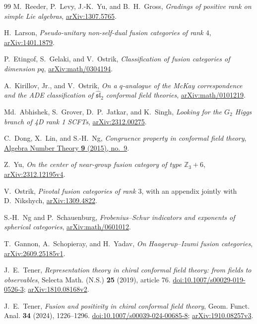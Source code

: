 \begin{thebibliography}{99}
M.~Reeder, P.~Levy, J.-K.~Yu, and B.~H.~Gross,
\emph{Gradings of positive rank on simple Lie algebras},
\href{https://arxiv.org/abs/1307.5765}{arXiv:1307.5765}.

H.~Larson,
\emph{Pseudo-unitary non-self-dual fusion categories of rank $4$},
\href{https://arxiv.org/abs/1401.1879}{arXiv:1401.1879}.

P.~Etingof, S.~Gelaki, and V.~Ostrik,
\emph{Classification of fusion categories of dimension $pq$},
\href{https://arxiv.org/abs/math/0304194}{arXiv:math/0304194}.

A.~Kirillov, Jr., and V.~Ostrik,
\emph{On a $q$-analogue of the McKay correspondence and the ADE classification
of $\widehat{\mathfrak{sl}}_2$ conformal field theories},
\href{https://arxiv.org/abs/math/0101219}{arXiv:math/0101219}.

Md.~Abhishek, S.~Grover, D.~P.~Jatkar, and K.~Singh,
\emph{Looking for the $G_2$ Higgs branch of 4D rank 1 SCFTs},
\href{https://arxiv.org/abs/2312.00275}{arXiv:2312.00275}.

C.~Dong, X.~Lin, and S.-H.~Ng,
\emph{Congruence property in conformal field theory},
\href{https://msp.org/ant/2015/9-9/ant-v9-n9-p03-s.pdf}{Algebra Number Theory
\textbf{9} (2015), no.~9}.

Z.~Yu,
\emph{On the center of near-group fusion category of type $\mathbb Z_3+6$},
\href{https://arxiv.org/abs/2312.12195v4}{arXiv:2312.12195v4}.

V.~Ostrik,
\emph{Pivotal fusion categories of rank $3$},
with an appendix jointly with D.~Nikshych,
\href{https://arxiv.org/abs/1309.4822}{arXiv:1309.4822}.

S.-H.~Ng and P.~Schauenburg,
\emph{Frobenius--Schur indicators and exponents of spherical categories},
\href{https://arxiv.org/abs/math/0601012}{arXiv:math/0601012}.

T.~Gannon, A.~Schopieray, and H.~Yadav,
\emph{On Haagerup--Izumi fusion categories},
\href{https://arxiv.org/abs/2609.25185v1}{arXiv:2609.25185v1}.

J.~E.~Tener,
\emph{Representation theory in chiral conformal field theory:
from fields to observables},
Selecta Math. (N.S.) \textbf{25} (2019), article 76.
\href{https://doi.org/10.1007/s00029-019-0526-3}{doi:10.1007/s00029-019-0526-3};
\href{https://arxiv.org/abs/1810.08168v2}{arXiv:1810.08168v2}.

J.~E.~Tener,
\emph{Fusion and positivity in chiral conformal field theory},
Geom. Funct. Anal. \textbf{34} (2024), 1226--1296.
\href{https://doi.org/10.1007/s00039-024-00685-8}{doi:10.1007/s00039-024-00685-8};
\href{https://arxiv.org/abs/1910.08257v3}{arXiv:1910.08257v3}.


\end{thebibliography}

